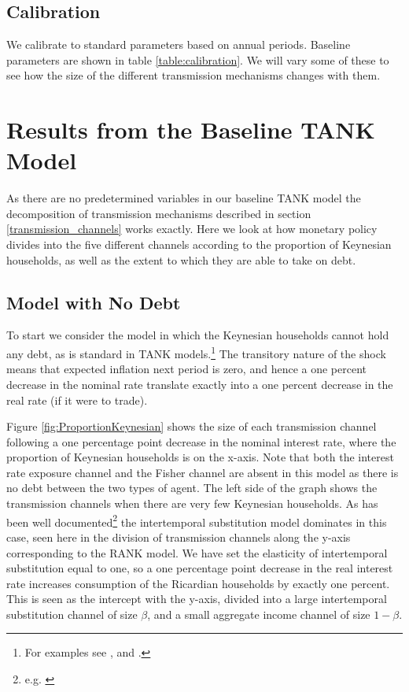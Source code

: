\documentclass[titlepage]{\econtex}\newcommand{\texname}{ConsumptionHeterogeneity}
\begin{document}
\subsection{Calibration}
We calibrate to standard parameters based on annual periods. Baseline parameters are shown in table \ref{table:calibration}. We will vary some of these to see how the size of the different transmission mechanisms changes with them.



\section{Results from the Baseline TANK Model}
As there are no predetermined variables in our baseline TANK model the decomposition of transmission mechanisms described in section \ref{transmission_channels} works exactly. Here we look at how monetary policy divides into the five different channels according to the proportion of Keynesian households, as well as the extent to which they are able to take on debt.

\subsection{Model with No Debt}
To start we consider the model in which the Keynesian households cannot hold any debt, as is standard in TANK models.\footnote{For examples see \cite{dgHANKTANK}, \cite{gali_understanding_2007} and \cite{broer_2018}.} The transitory nature of the shock means that expected inflation next period is zero, and hence a one percent decrease in the nominal rate translate exactly into a one percent decrease in the real rate (if it were to trade).

Figure \ref{fig:ProportionKeynesian} shows the size of each transmission channel following a one percentage point decrease in the nominal interest rate, where the proportion of Keynesian households is on the x-axis. Note that both the interest rate exposure channel and the Fisher channel are absent in this model as there is no debt between the two types of agent. The left side of the graph shows the transmission channels when there are very few Keynesian households. As has been well documented\footnote{e.g. \cite{kaplan_monetary_2016}} the intertemporal substitution model dominates in this case, seen here in the division of transmission channels along the y-axis corresponding to the RANK model. We have set the elasticity of intertemporal substitution equal to one, so a one percentage point decrease in the real interest rate increases consumption of the Ricardian households by exactly one percent. This is seen as the intercept with the y-axis, divided into a large intertemporal substitution channel of size $\beta$, and a small aggregate income channel of size $1-\beta$.
\end{document}

